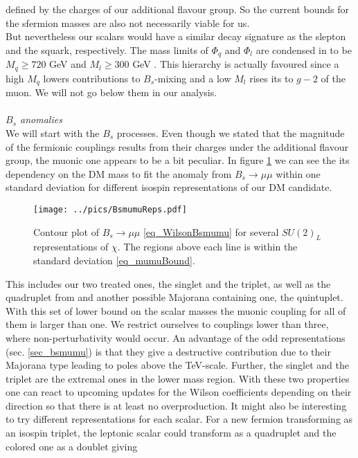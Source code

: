 defined by the charges of our additional flavour group. So the current bounds for the sfermion masses are also not necessarily viable for us.\\
\noindent But nevertheless our scalars would have a similar decay signature as the slepton and the squark, respectively. The mass limits of $\Phi_q$
and $\Phi_l$ are condensed in \cite{Grip} to be $M_q \geq 720$ GeV \cite{1506.08616} and $M_l \geq 300$ GeV \cite{1403.5294}. This hierarchy is
actually favoured since a high $M_q$ lowers contributions to $B_s$-mixing and a low $M_l$ rises its to $g-2$ of the muon. We will not go 
below them in our analysis. 
\\ \\ \textit{$B_s$ anomalies}\\
\noindent We will start with the $B_s$ processes. Even though we stated that the magnitude of the fermionic couplings results from their charges
under the additional flavour group, the muonic one appears to be a bit peculiar. In figure \ref{pic_BsMumuReps} we can see the its dependency on
the DM mass to fit the anomaly from $B_s\rightarrow \mu\mu$ within one standard deviation for different isospin representations of our DM
candidate. 
\begin{figure}[t]
 \texttt{[image: ../pics/BsmumuReps.pdf]}
 \caption{Contour plot of $B_s\rightarrow \mu\mu$ \eqref{eq_WilsonBsmumu} for several $SU(2)_L$ representations of $\chi$. The regions above each 
 line is within the standard deviation \eqref{eq_mumuBound}.}
 \label{pic_BsMumuReps}
\end{figure}
This includes our two treated ones, the singlet and the triplet, as well as the quadruplet from \cite{Grip} and another possible Majorana
containing one, the quintuplet. With this set of lower bound on the scalar masses the muonic coupling for all of them is larger than one. We restrict
ourselves to couplings lower than three, where non-perturbativity would occur. An advantage of the odd representations (sec. \ref{sec_bsmumu}) is
that they give a destructive contribution due to their Majorana type leading to poles above the TeV-scale. Further, the singlet and the triplet
are the extremal ones in the lower mass region. With these two properties one can react to upcoming updates for the Wilson coefficients depending
on their direction so that there is at least no overproduction. It might also be interesting to try different representations for each scalar.
For a new fermion transforming as an isospin triplet, the leptonic scalar could transform as a quadruplet and the colored one as a doublet giving
